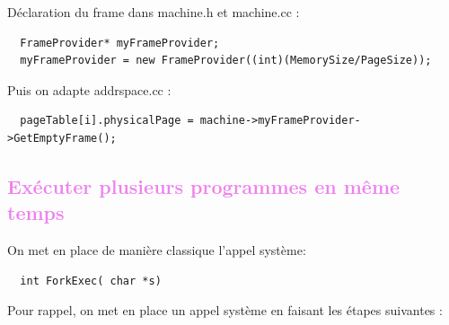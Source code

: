 \documentclass[a4paper,10pt]{article}
\begin{document}
  Déclaration du frame dans machine.h et machine.cc :

  \begin{lstlisting}
  FrameProvider* myFrameProvider;
  myFrameProvider = new FrameProvider((int)(MemorySize/PageSize));
  \end{lstlisting}

  Puis on adapte addrspace.cc :

  \begin{lstlisting}
  pageTable[i].physicalPage = machine->myFrameProvider->GetEmptyFrame();
  \end{lstlisting}

  \textcolor{Violet}{\section{Exécuter plusieurs programmes en même temps}}
  On met en place de manière classique l'appel système: 
  \begin{lstlisting}
  int ForkExec( char *s)
  \end{lstlisting}
  Pour rappel, on met en place un appel système en faisant les étapes suivantes :
\end{document}

